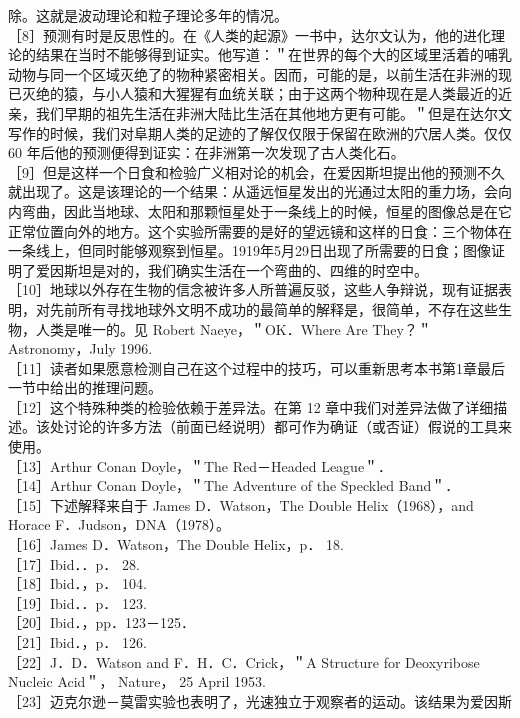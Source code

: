 除。这就是波动理论和粒子理论多年的情况。\\
［8］预测有时是反思性的。在《人类的起源》一书中，达尔文认为，他的进化理论的结果在当时不能够得到证实。他写道：＂在世界的每个大的区域里活着的哺乳动物与同一个区域灭绝了的物种紧密相关。因而，可能的是，以前生活在非洲的现已灭绝的猿，与小人猿和大猩猩有血统关联；由于这两个物种现在是人类最近的近亲，我们早期的祖先生活在非洲大陆比生活在其他地方更有可能。＂但是在达尔文写作的时候，我们对阜期人类的足迹的了解仅仅限于保留在欧洲的穴居人类。仅仅 60 年后他的预测便得到证实：在非洲第一次发现了古人类化石。\\
［9］但是这样一个日食和检验广义相对论的机会，在爱因斯坦提出他的预测不久就出现了。这是该理论的一个结果：从遥远恒星发出的光通过太阳的重力场，会向内弯曲，因此当地球、太阳和那颗恒星处于一条线上的时候，恒星的图像总是在它正常位置向外的地方。这个实验所需要的是好的望远镜和这样的日食：三个物体在一条线上，但同时能够观察到恒星。1919年5月29日出现了所需要的日食；图像证明了爱因斯坦是对的，我们确实生活在一个弯曲的、四维的时空中。\\
［10］地球以外存在生物的信念被许多人所普遍反驳，这些人争辩说，现有证据表明，对先前所有寻找地球外文明不成功的最简单的解释是，很简单，不存在这些生物，人类是唯一的。见 Robert Naeye，＂OK．Where Are They？＂Astronomy，July 1996.\\
［11］读者如果愿意检测自己在这个过程中的技巧，可以重新思考本书第1章最后一节中给出的推理问题。\\
［12］这个特殊种类的检验依赖于差异法。在第 12 章中我们对差异法做了详细描述。该处讨论的许多方法（前面已经说明）都可作为确证（或否证）假说的工具来使用。\\
［13］Arthur Conan Doyle，＂The Red－Headed League＂．\\
［14］Arthur Conan Doyle，＂The Adventure of the Speckled Band＂．\\
［15］下述解释来自于 James D．Watson，The Double Helix（1968），and Horace F．Judson，DNA（1978）。\\
［16］James D．Watson，The Double Helix，p． 18.\\
［17］Ibid．．p． 28.\\
［18］Ibid．，p． 104.\\
［19］Ibid．．p． 123.\\
［20］Ibid．，pp．123－125．\\
［21］Ibid．，p． 126.\\
［22］J．D．Watson and F．H．C．Crick，＂A Structure for Deoxyribose Nucleic Acid＂， Nature， 25 April 1953.\\
［23］迈克尔逊－莫雷实验也表明了，光速独立于观察者的运动。该结果为爱因斯

